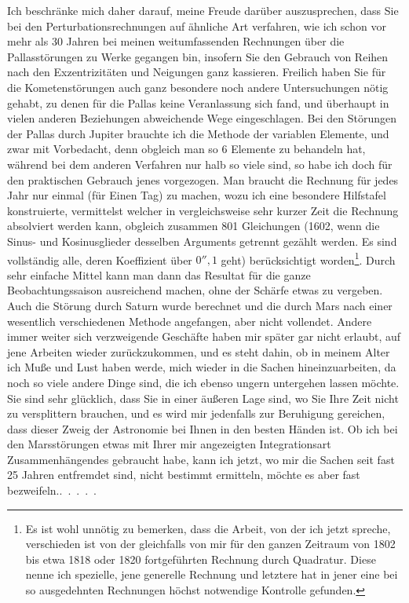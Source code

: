\par Ich beschränke mich daher darauf, meine Freude darüber auszusprechen, dass Sie bei den Perturbationsrechnungen auf ähnliche Art verfahren, wie ich schon vor mehr als 30 Jahren bei meinen weitumfassenden Rechnungen über die Pallasstörungen zu Werke gegangen bin, insofern Sie den Gebrauch von Reihen nach den Exzentrizitäten und Neigungen ganz kassieren. Freilich haben Sie für die Kometenstörungen auch ganz besondere noch andere Untersuchungen nötig gehabt, zu denen für die Pallas keine Veranlassung sich fand, und überhaupt in vielen anderen Beziehungen abweichende Wege eingeschlagen. Bei den Störungen der Pallas durch Jupiter brauchte ich die Methode der variablen Elemente, und zwar mit Vorbedacht, denn obgleich man so 6 Elemente zu behandeln hat, während bei dem anderen Verfahren nur halb so viele sind, so habe ich doch für den praktischen Gebrauch jenes vorgezogen. Man braucht die Rechnung für jedes Jahr nur einmal (für Einen Tag) zu machen, wozu ich eine besondere Hilfstafel konstruierte, vermittelst welcher in vergleichsweise sehr kurzer Zeit die Rechnung absolviert werden kann, obgleich zusammen 801 Gleichungen (1602, wenn die Sinus- und Kosinusglieder desselben Arguments getrennt gezählt werden. Es sind vollständig alle, deren Koeffizient über \(0''{,}1\) geht) berücksichtigt worden\footnote{Es ist wohl unnötig zu bemerken, dass die Arbeit, von der ich jetzt spreche,  verschieden ist von der gleichfalls von mir für den ganzen Zeitraum von 1802 bis etwa 1818 oder 1820 fortgeführten Rechnung durch Quadratur. Diese nenne ich spezielle, jene generelle Rechnung und letztere hat in jener eine bei so ausgedehnten Rechnungen höchst notwendige Kontrolle gefunden.}. Durch sehr einfache Mittel kann man dann das Resultat für die ganze Beobachtungssaison ausreichend machen, ohne der Schärfe etwas zu vergeben. Auch die Störung durch Saturn wurde berechnet und die durch Mars nach einer wesentlich verschiedenen Methode angefangen, aber nicht vollendet. Andere immer weiter sich verzweigende Geschäfte haben mir später gar nicht erlaubt, auf jene Arbeiten wieder zurückzukommen, und es steht dahin, ob in meinem Alter ich Muße und Lust haben werde, mich wieder in die Sachen hineinzuarbeiten, da noch so viele andere Dinge sind, die ich ebenso ungern untergehen lassen möchte. Sie sind sehr glücklich, dass Sie in einer äußeren Lage sind, wo Sie Ihre Zeit nicht zu versplittern brauchen, und es wird mir jedenfalls zur Beruhigung gereichen, dass dieser Zweig der Astronomie bei Ihnen in den besten Händen ist. Ob ich bei den Marsstörungen etwas mit Ihrer mir angezeigten Integrationsart Zusammenhängendes gebraucht habe, kann ich jetzt, wo mir die Sachen seit fast 25 Jahren entfremdet sind, nicht bestimmt ermitteln, möchte es aber fast bezweifeln.\quad\mbox{. . . . .}
\par
